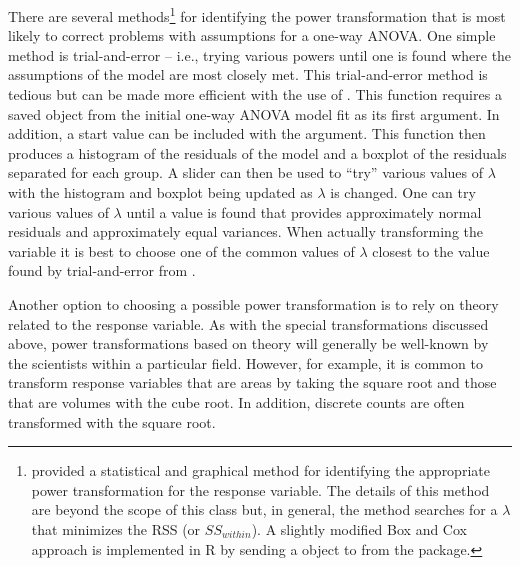 \documentclass[10pt,openany]{book}\usepackage[]{graphicx}\usepackage[]{color}
\begin{document}

\vspace{-10pt}

There are several methods\footnote{\cite{BoxCox1964} provided a statistical and graphical method for identifying the appropriate power transformation for the response variable.  The details of this method are beyond the scope of this class but, in general, the method searches for a $\lambda$ that minimizes the RSS (or $SS_{within}$).  A slightly modified Box and Cox approach is implemented in R by sending a  object to  from the  package.} for identifying the power transformation that is most likely to correct problems with assumptions for a one-way ANOVA.  One simple method is trial-and-error -- i.e., trying various powers until one is found where the assumptions of the model are most closely met.  This trial-and-error method is tedious but can be made more efficient with the use of .  This function requires a saved  object from the initial one-way ANOVA model fit as its first argument.  In addition, a start value can be included with the  argument.  This function then produces a histogram of the residuals of the model and a boxplot of the residuals separated for each group.  A slider can then be used to ``try'' various values of $\lambda$ with the histogram and boxplot being updated as $\lambda$ is changed.  One can try various values of $\lambda$ until a value is found that provides approximately normal residuals and approximately equal variances.  When actually transforming the variable it is best to choose one of the common values of $\lambda$ closest to the value found by trial-and-error from .

Another option to choosing a possible power transformation is to rely on theory related to the response variable.  As with the special transformations discussed above, power transformations based on theory will generally be well-known by the scientists within a particular field.  However, for example, it is common to transform response variables that are areas by taking the square root and those that are volumes with the cube root.  In addition, discrete counts are often transformed with the square root.
\end{document}
